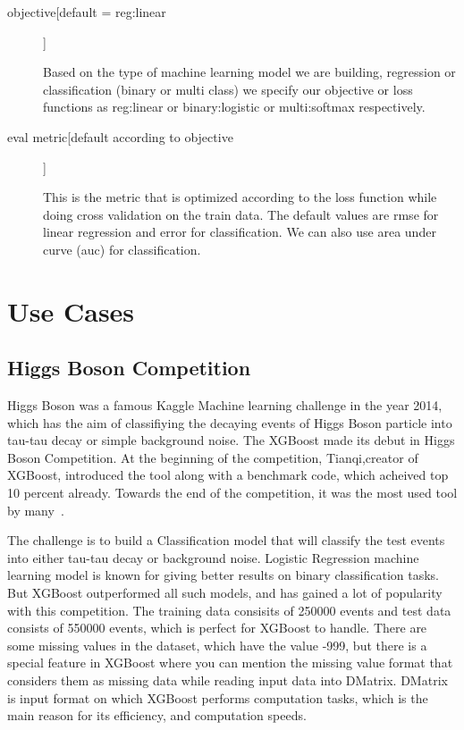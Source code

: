 \begin{description}

\item[objective[default = reg:linear]]

Based on the type of machine learning model we are building, regression or
classification (binary or multi class) we specify our objective or loss
functions as reg:linear or binary:logistic or  multi:softmax respectively.

\item[eval metric[default according to objective]]

This is the metric that is optimized according to the loss function while
doing cross  validation on the train data. The default values are rmse for
linear regression and  error  for classification. We can also use area under
curve (auc) for classification.

\end{description}

\section{Use Cases}

\subsection{Higgs Boson Competition}

Higgs Boson was a famous Kaggle Machine learning challenge in the year 2014,
which has the  aim of classifiying the decaying events of Higgs Boson particle
into tau-tau decay or simple  background noise. The XGBoost made its debut in
Higgs Boson Competition. At the beginning of  the competition, Tianqi,creator
of XGBoost, introduced the tool along with a benchmark code,  which acheived
top 10 percent already. Towards the end of the competition, it was the most
used tool by many~\cite{hid-sp18-401-Kaggle-Higgs-Boson}. 

The challenge is to build a Classification model that will classify the test
events into either tau-tau decay or background noise. Logistic Regression
machine learning model is known for giving better results on binary
classification tasks. But XGBoost outperformed all such models, and has gained
a lot of popularity with this competition. The training data consisits of
250000 events and test data consists of 550000 events, which is perfect for
XGBoost to handle. There are some missing values in the dataset, which  have
the value -999, but there is a special feature in XGBoost where you can
mention the missing value format that considers them as missing data while
reading input data into DMatrix. DMatrix is input format on which XGBoost
performs computation tasks, which is the main reason for its efficiency, and
computation speeds.

